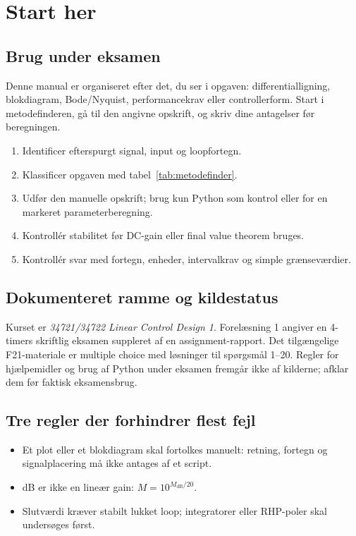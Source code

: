 \section{Start her}

\subsection{Brug under eksamen}

Denne manual er organiseret efter det, du ser i opgaven: differentialligning, blokdiagram,
Bode/Nyquist, performancekrav eller controllerform. Start i metodefinderen, gå til den
angivne opskrift, og skriv dine antagelser før beregningen.

\begin{enumerate}
\item Identificer efterspurgt signal, input og loopfortegn.
\item Klassificer opgaven med tabel~\ref{tab:metodefinder}.
\item Udfør den manuelle opskrift; brug kun Python som kontrol eller for en markeret
      parameterberegning.
\item Kontrollér stabilitet før DC-gain eller final value theorem bruges.
\item Kontrollér svar med fortegn, enheder, intervalkrav og simple grænseværdier.
\end{enumerate}

\subsection{Dokumenteret ramme og kildestatus}

Kurset er \emph{34721/34722 Linear Control Design 1}. Forelæsning 1 angiver en
4-timers skriftlig eksamen suppleret af en assignment-rapport. Det tilgængelige
F21-materiale er multiple choice med løsninger til spørgsmål 1--20. Regler for
hjælpemidler og brug af Python under eksamen fremgår ikke af kilderne; afklar dem
før faktisk eksamensbrug.

\subsection{Tre regler der forhindrer flest fejl}

\begin{itemize}
\item Et plot eller et blokdiagram skal fortolkes manuelt: retning, fortegn og signalplacering
      må ikke antages af et script.
\item dB er ikke en lineær gain: \(M=10^{M_{\mathrm{dB}}/20}\).
\item Slutværdi kræver stabilt lukket loop; integratorer eller RHP-poler skal undersøges først.
\end{itemize}
